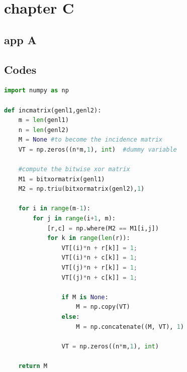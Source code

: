 \appendix
\chapter{chapter C}
\lipsum[13]

\section{app A}
\lipsum[14-15]

\section{Codes}
\begin{mdframed}
    \begin{lstlisting}[language=Python]
import numpy as np

def incmatrix(genl1,genl2):
    m = len(genl1)
    n = len(genl2)
    M = None #to become the incidence matrix
    VT = np.zeros((n*m,1), int)  #dummy variable

    #compute the bitwise xor matrix
    M1 = bitxormatrix(genl1)
    M2 = np.triu(bitxormatrix(genl2),1)

    for i in range(m-1):
        for j in range(i+1, m):
            [r,c] = np.where(M2 == M1[i,j])
            for k in range(len(r)):
                VT[(i)*n + r[k]] = 1;
                VT[(i)*n + c[k]] = 1;
                VT[(j)*n + r[k]] = 1;
                VT[(j)*n + c[k]] = 1;

                if M is None:
                    M = np.copy(VT)
                else:
                    M = np.concatenate((M, VT), 1)

                VT = np.zeros((n*m,1), int)

    return M
\end{lstlisting}
\end{mdframed}



